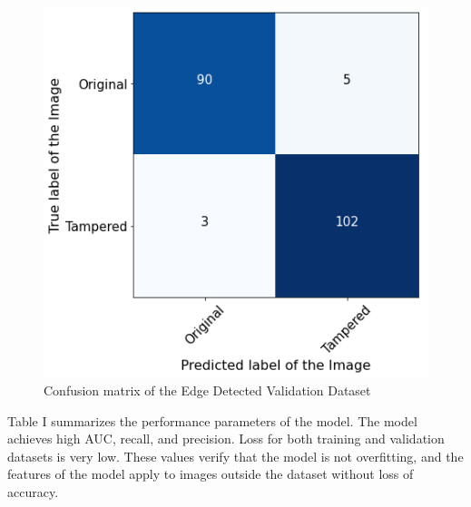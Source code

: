 \documentclass[conference]{IEEEtran}
\begin{document}
\begin{figure}[htpb]
\centerline{\includegraphics[scale=0.4]{confusion.png}}
\caption{Confusion matrix of the Edge Detected Validation Dataset}
\label{confusion}
\end{figure}

\begin{table}[htpb]
\caption{\label{tab:res}Performance metrics of the CNN model using the Edge Detected Dataset}
\centering
{}
\end{table}

Table I summarizes the performance parameters of the model. The model achieves high AUC, recall, and precision. Loss for both training and validation datasets is very low. These values verify that the model is not overfitting, and the features of the model apply to images outside the dataset without loss of accuracy. 
\end{document}

